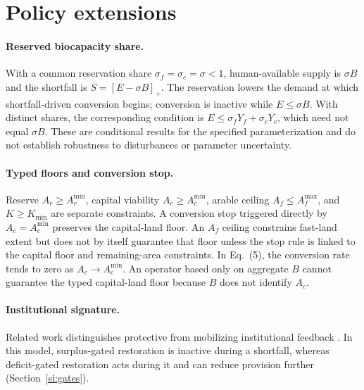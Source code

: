 \documentclass[11pt,a4paper]{article}
\newcommand{\Acmin}{A_c^{\min}}
\begin{document}
\section{Policy extensions}\label{si:policy}

\paragraph{Reserved biocapacity share.} With a common reservation share $\sigma_f=\sigma_c=\sigma<1$, human-available supply is $\sigma B$ and the shortfall is $S=[E-\sigma B]_+$. The reservation lowers the demand at which shortfall-driven conversion begins; conversion is inactive while $E\le\sigma B$. With distinct shares, the corresponding condition is $E\le\sigma_fY_f+\sigma_cY_c$, which need not equal $\sigma B$. These are conditional results for the specified parameterization and do not establish robustness to disturbances or parameter uncertainty.

\paragraph{Typed floors and conversion stop.} Reserve $A_r\ge A_r^{\min}$, capital viability $A_c\ge\Acmin$, arable ceiling $A_f\le A_f^{\max}$, and $K\ge K_{\min}$ are separate constraints. A conversion stop triggered directly by $A_c=\Acmin$ preserves the capital-land floor. An $A_f$ ceiling constrains fast-land extent but does not by itself guarantee that floor unless the stop rule is linked to the capital floor and remaining-area constraints. In Eq.~(5), the conversion rate tends to zero as $A_c\to\Acmin$. An operator based only on aggregate $B$ cannot guarantee the typed capital-land floor because $B$ does not identify $A_c$.

\paragraph{Institutional signature.} Related work distinguishes protective from mobilizing institutional feedback \citep{Abaee2026b}. In this model, surplus-gated restoration is inactive during a shortfall, whereas deficit-gated restoration acts during it and can reduce provision further (Section~\ref{si:gates}).
\end{document}

